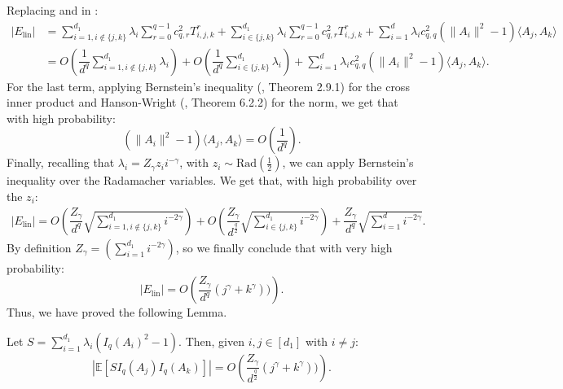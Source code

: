 \documentclass[]{article}
\numberwithin{equation}{section}
\theoremstyle{definition}
\newcommand{\EE}{\mathbb{E}}
\begin{document}
Replacing  and  in 
: 
\begin{align}
    \left | E_\mathrm{lin} \right | &= \sum_{i=1, i \not \in\{ j,k\}}^{d_1}  \lambda_i \sum_{r=0}^{q-1}c_{q,r}^{2} T^{r}_{i,j,k}+ \sum_{i \in \{j,k \}}^{d_1}  \lambda_i \sum_{r=0}^{q-1}c_{q,r}^{2} T^{r}_{i,j,k} + \sum_{i=1}^{d} \lambda_i c_{q,q}^{2} (\| A_i \|^2 -1) \langle A_j, A_k \rangle \\
    & = O \left ( \dfrac{1}{d^{q}}\sum_{i=1, i \not \in \{ j,k\}}^{d_1}  \lambda_i \right ) + O \left ( \dfrac{1}{d^{q}}\sum_{i\in \{ j,k\}}^{d_1}  \lambda_i \right ) + \sum_{i=1}^{d} \lambda_i c_{q,q}^{2} (\| A_i \|^2 -1) \langle A_j, A_k \rangle. 
\end{align}
For the last term, applying Bernstein's inequality (\cite{vershynin2018high}, Theorem 2.9.1) for the cross inner product and Hanson-Wright (\cite{vershynin2018high}, Theorem 6.2.2) for the norm, we get that with high probability: 
\begin{equation}
    (\| A_i \|^2 -1) \langle A_j, A_k \rangle = O \left(\dfrac{1}{d^{q}} \right ).
\end{equation}
Finally, recalling that $\lambda_i = Z_\gamma z_i i^{-\gamma}$, with $z_i \sim \mathrm{Rad}(\frac{1}{2})$, we can apply Bernstein's inequality over the Radamacher variables. We get that, with high probability over the $z_i$: 
\begin{align}
    \left | E_\mathrm{lin} \right | =O \left ( \dfrac{Z_\gamma}{d^{q}}\sqrt{\sum_{i=1, i \not \in \{ j,k\}}^{d_1}  i^{-2\gamma}} \right ) + O \left ( \dfrac{Z_\gamma}{d^{\frac{q}{2}}}\sqrt{\sum_{i\in \{ j,k\}}^{d_1}  i^{-2\gamma}} \right ) + \dfrac{Z_\gamma}{d^{q}}\sqrt{\sum_{i=1}^{d} i^{-2\gamma} }. 
\end{align}
By definition $Z_\gamma = (\sum_{i=1}^{d_1} i^{-2\gamma})$, so we finally conclude that with very high probability: 
\begin{equation}
    \left | E_\mathrm{lin} \right | = O \left ( \dfrac{Z_\gamma}{d^{q}}(j^{\gamma} + k^{\gamma}))\right ). 
\end{equation}
Thus, we have proved the following Lemma. 
\begin{lemma}
    Let $S = \sum_{i=1}^{d_1} \lambda_i (I_{q}(A_i)^{2} -1)$. Then, given $i, j \in [d_1]$ with $i \not = j$: 
    \[
     \left | \EE \left [ S I_{q}(A_j) I_{q}(A_k)\right ] \right | = O \left ( \dfrac{Z_\gamma}{d^{\frac{q}{2}}}(j^{\gamma} + k^{\gamma}))\right ). 
    \]
    \label{lemma:linear_case_cross_expectations}
\end{lemma}
\end{document}
